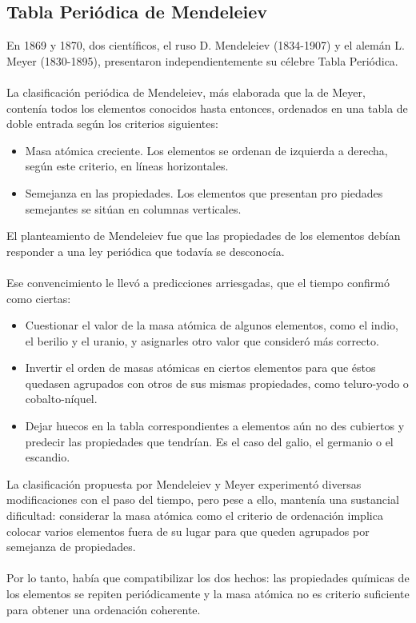 \documentclass[12pt]{article}
\begin{document}
               \subsection{Tabla Periódica de Mendeleiev}\label{sec:Tabla Periódica de Mendeleiev}
               En 1869 y 1870, dos científicos, el ruso D. Mendeleiev (1834-1907) y el alemán L. Meyer (1830-1895), presentaron independientemente su célebre Tabla Periódica.\\\\
               La clasificación periódica de Mendeleiev, más elaborada que la de Meyer, contenía todos los elementos conocidos hasta entonces, ordenados en una tabla de doble entrada según los criterios siguientes:

               \begin{itemize}
                    \item Masa atómica creciente. Los elementos se ordenan de izquierda a derecha, según este criterio, en líneas horizontales.
                    \item Semejanza en las propiedades. Los elementos que presentan pro piedades semejantes se sitúan en columnas verticales.
               \end{itemize}

               El planteamiento de Mendeleiev fue que las propiedades de los elementos debían responder a una ley periódica que todavía se desconocía.\\\\
               Ese convencimiento le llevó a predicciones arriesgadas, que el tiempo confirmó como ciertas:

               \begin{itemize}
                    \item Cuestionar el valor de la masa atómica de algunos elementos, como el indio, el berilio y el uranio, y asignarles otro valor que consideró más correcto.
                    \item Invertir el orden de masas atómicas en ciertos elementos para que éstos quedasen agrupados con otros de sus mismas propiedades, como teluro-yodo o cobalto-níquel.
                    \item Dejar huecos en la tabla correspondientes a elementos aún no des cubiertos y predecir las propiedades que tendrían. Es el caso del galio, el germanio o el escandio.
               \end{itemize}

               La clasificación propuesta por Mendeleiev y Meyer experimentó diversas modificaciones con el paso del tiempo, pero pese a ello, mantenía una sustancial dificultad: considerar la masa atómica como el criterio de ordenación implica colocar varios elementos fuera de su lugar para que queden agrupados por semejanza de propiedades.\\\\
               Por lo tanto, había que compatibilizar los dos hechos: las propiedades químicas de los elementos se repiten periódicamente y la masa atómica no es criterio suficiente para obtener una ordenación coherente.
\end{document}
